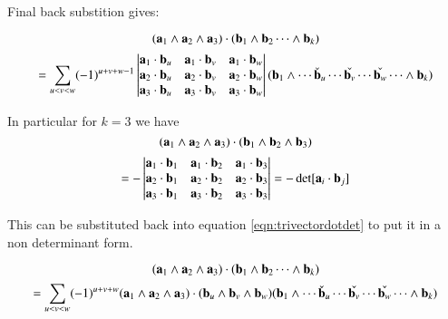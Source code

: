 \documentclass{article}      %
\begin{document}
Final back substition gives:

\begin{equation*}
(\mathbf{a}_1 \wedge \mathbf{a}_{2} \wedge \mathbf{a}_3) \cdot (\mathbf{b}_1 \wedge \mathbf{b}_2 \cdots \wedge \mathbf{b}_k) 
\end{equation*}
\begin{equation}\label{eqn:trivectordotdet}
=
\sum_{u<v<w} (-1)^{u+v+w-1} 
\begin{vmatrix}
\mathbf{a}_1 \cdot \mathbf{b}_u & \mathbf{a}_1 \cdot \mathbf{b}_v & \mathbf{a}_1 \cdot \mathbf{b}_w \\
\mathbf{a}_2 \cdot \mathbf{b}_u & \mathbf{a}_2 \cdot \mathbf{b}_v & \mathbf{a}_2 \cdot \mathbf{b}_w \\
\mathbf{a}_3 \cdot \mathbf{b}_u & \mathbf{a}_3 \cdot \mathbf{b}_v & \mathbf{a}_3 \cdot \mathbf{b}_w \\
\end{vmatrix} 
(\mathbf{b}_1 \wedge \cdots \check {\mathbf{b}}_u \cdots \check{\mathbf{b}_v} \cdots \check{\mathbf{b}_w} \cdots \wedge \mathbf{b}_k)  \\
\end{equation}

In particular for $k=3$ we have
\begin{equation*}
(\mathbf{a}_1 \wedge \mathbf{a}_{2} \wedge \mathbf{a}_3) \cdot (\mathbf{b}_1 \wedge \mathbf{b}_2 \wedge \mathbf{b}_3) 
\end{equation*}
\begin{equation}\label{eqn:trivectordotdettri}
=
-\begin{vmatrix}
\mathbf{a}_1 \cdot \mathbf{b}_1 & \mathbf{a}_1 \cdot \mathbf{b}_2 & \mathbf{a}_1 \cdot \mathbf{b}_3 \\
\mathbf{a}_2 \cdot \mathbf{b}_1 & \mathbf{a}_2 \cdot \mathbf{b}_2 & \mathbf{a}_2 \cdot \mathbf{b}_3 \\
\mathbf{a}_3 \cdot \mathbf{b}_1 & \mathbf{a}_3 \cdot \mathbf{b}_2 & \mathbf{a}_3 \cdot \mathbf{b}_3 \\
\end{vmatrix} 
=
-\det[\mathbf{a}_i \cdot \mathbf{b}_j]
\end{equation}

This can be substituted back into equation \ref{eqn:trivectordotdet} to put it in a non determinant form.

\begin{equation*}
(\mathbf{a}_1 \wedge \mathbf{a}_{2} \wedge \mathbf{a}_3) \cdot (\mathbf{b}_1 \wedge \mathbf{b}_2 \cdots \wedge \mathbf{b}_k) 
\end{equation*}
\begin{equation}\label{eqn:trivectordotnondet}
=
\sum_{u<v<w} (-1)^{u+v+w} 
(\mathbf{a}_1 \wedge \mathbf{a}_{2} \wedge \mathbf{a}_3) \cdot (\mathbf{b}_u \wedge \mathbf{b}_v \wedge \mathbf{b}_w) 
(\mathbf{b}_1 \wedge \cdots \check {\mathbf{b}}_u \cdots \check{\mathbf{b}_v} \cdots \check{\mathbf{b}_w} \cdots \wedge \mathbf{b}_k)  \\
\end{equation}
\end{document}
